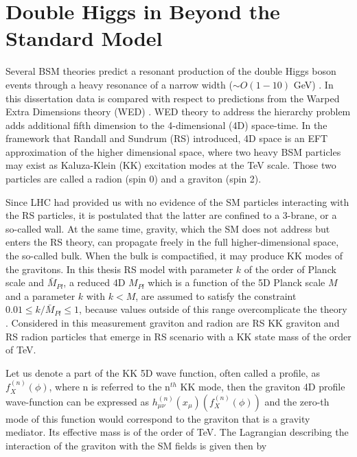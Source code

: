 \section{Double Higgs in Beyond the Standard Model}

Several BSM theories \cite{Huang:2017nnw, Dolan:2012ac, Kanemura:2016tan} predict a resonant production of the double Higgs boson events through a heavy resonance of a narrow width ($\sim O(1-10)$ GeV) \cite{Sirunyan:2018iwt}. In this dissertation data is compared with respect to predictions from the Warped Extra Dimensions theory (WED) \cite{Oliveira:2014kla}. WED theory to address the hierarchy problem adds additional fifth dimension to the 4-dimensional (4D) space-time. In the framework that Randall and Sundrum (RS) \cite{Randall:1999ee} introduced, 4D space is an EFT approximation of the higher dimensional space, where two heavy BSM particles may exist as Kaluza-Klein (KK) \cite{Uzawa:1999pg} excitation modes at the TeV scale. Those two particles are called a radion (spin 0) and a graviton (spin 2). 

Since LHC had provided us with no evidence of the SM particles interacting with the RS particles, it is postulated that the latter are confined to a 3-brane, or a so-called wall. At the same time, gravity, which the SM does not address but enters the RS theory, can propagate freely in the full higher-dimensional space, the so-called bulk. When the bulk is compactified, it may produce KK modes of the gravitons. In this thesis RS model with parameter $k$ of the order of Planck scale and $\bar{M}_{Pl}$, a reduced 4D $M_{Pl}$ which is a function of the 5D Planck scale $M$ and a parameter $k$ with $k<M$, are assumed to satisfy the constraint $0.01 \leq k / \bar{M}_{Pl} \leq 1$, because values outside of this range overcomplicate the theory \cite{Davoudiasl:1999jd}. Considered in this measurement graviton and radion are RS KK graviton and RS radion particles that emerge in RS scenario with a KK state mass of the order of TeV. 

Let us denote a part of the KK 5D wave function, often called a profile, as $f^{(n)}_X(\phi)$, where n is referred to the n$^{th}$ KK mode, then the graviton 4D profile wave-function can be expressed as $h^{(n)}_{\mu\nu}(x_\mu)(f^{(n)}_X(\phi))$ and the zero-th mode of this function would correspond to the graviton that is a gravity mediator. Its effective mass is of the order of TeV. The Lagrangian describing the interaction of the graviton with the SM fields is given then by 

